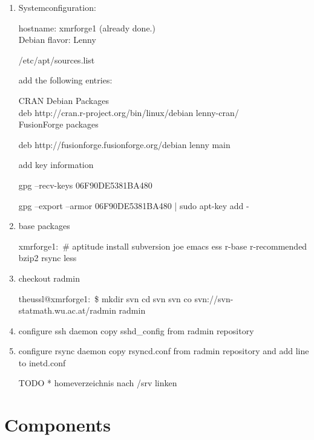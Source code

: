 \documentclass[a4paper]{article}
\begin{document}
\begin{enumerate}
	\item Systemconfiguration:
	
	hostname: xmrforge1 (already done.)\\
        Debian flavor: Lenny
	
\fboxrule=0.5mm
{/etc/apt/sources.list}	

	add the following entries:	
	

CRAN Debian Packages\\

\fboxrule=0.5mm
{deb http://cran.r-project.org/bin/linux/debian lenny-cran/}
\\
FusionForge packages

\fboxrule=0.5mm
{deb http://fusionforge.fusionforge.org/debian lenny main}

add key information

\fboxrule=0.5mm
{gpg --recv-keys 06F90DE5381BA480}

\fboxrule=0.5mm
{gpg --export --armor 06F90DE5381BA480 | sudo apt-key add -}

	

	\item base packages


\fboxrule=0.5mm
{xmrforge1:~\# aptitude install subversion joe emacs ess r-base r-recommended bzip2 rsync less}

	\item checkout radmin

\fboxrule=0.5mm
{theussl@xmrforge1:~\$ mkdir svn 
cd svn
svn co svn://svn-statmath.wu.ac.at/radmin radmin
}


\item configure ssh daemon 
\fboxrule=0.5mm
{copy sshd\_config from radmin repository}

\item configure rsync daemon 
\fboxrule=0.5mm
{copy rsyncd.conf from radmin repository and add line to inetd.conf}

TODO * homeverzeichnis nach /srv linken

\end{enumerate}


\section{Components}
\label{sec:registration}
\end{document}
